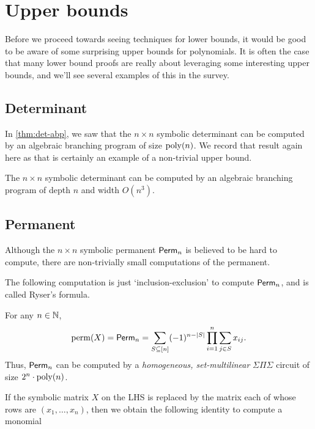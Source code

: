 \chapter{Upper bounds}\label{chap:upper-bounds}

Before we proceed towards seeing techniques for lower bounds, it would be good to be aware of some surprising upper bounds for polynomials. 
It is often the case that many lower bound proofs are really about leveraging some interesting upper bounds, and we'll see several examples of this in the survey. 


\section{Determinant}

In \autoref{thm:det-abp}, we saw that the $n\times n$ symbolic determinant can be computed by an algebraic branching program of size $\operatorname{poly}(n)$. 
We record that result again here as that is certainly an example of a non-trivial upper bound. 

\begin{theorem*} The $n\times n$ symbolic determinant can be computed by an algebraic branching program of depth $n$ and width $O(n^3)$. 
\end{theorem*}

\section{Permanent}

Although the $n\times n$ symbolic permanent $\operatorname{\mathsf{Perm}}_n$ is believed to be hard to compute, there are non-trivially small computations of the permanent. 

The following computation is just `inclusion-exclusion' to compute $\operatorname{\mathsf{Perm}}_n$, and is called Ryser's formula. 

\begin{lemma} For any $n \in \mathbb{N}$, 
  \[
  \operatorname{perm}(X) = \operatorname{\mathsf{Perm}}_n = \sum_{S \subseteq [n]} (-1)^{n-|S|} \prod_{i=1}^n \sum_{j\in S} x_{ij}.
  \]
  Thus, $\operatorname{\mathsf{Perm}}_n$ can be computed by a \emph{homogeneous, set-multilinear} $\Sigma\Pi\Sigma$ circuit of size $2^n \cdot \operatorname{poly}(n)$. 
\end{lemma}

If the symbolic matrix $X$ on the LHS is replaced by the matrix each of whose rows are $(x_1, \ldots, x_n)$, then we obtain the following identity to compute a monomial

